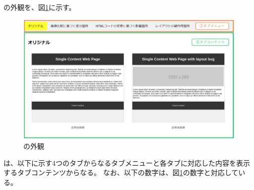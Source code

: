 \toolName の外観を、図\ref{fig: Appearance}に示す。
\begin{figure}[tp]
    \begin{center}
        \includegraphics[width=1.0\columnwidth]{image/3_Appearance.png}
        \caption{\toolName の外観}
        \label{fig: Appearance}
    \end{center}
\end{figure}
\toolName は、以下に示す4つのタブからなるタブメニューと各タブに対応した内容を表示するタブコンテンツからなる。
なお、以下の数字は、図\ref{fig: Appearance}の数字と対応している。
